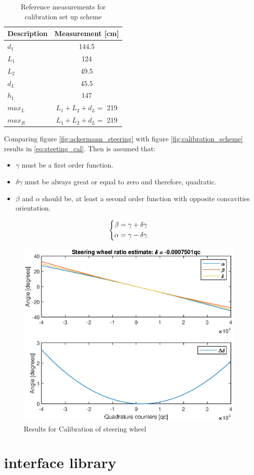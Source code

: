 \begin{table}[!hb]
	\centering
	\begin{tabular}{lc}
		\toprule
		\textbf{Description} & \textbf{Measurement [cm]}\\
		\midrule
		$d_1$ & 144.5\\
		$L_1$ & 124\\
		$L_2$ & 49.5\\
		$d_L$ & 45.5\\
		$h_1$ & 147\\
		$max_L$ & $L_1+L_2+d_L=$ 219\\
		$max_R$ & $L_1+L_2+d_L=$ 219\\
		\bottomrule
	\end{tabular}
	\caption{Reference measurements for calibration set up scheme}
	\label{tab:calibration_scheme}
\end{table}

Comparing figure \ref{fig:ackermann_steering} with figure \ref{fig:calibration_scheme} results in \eqref{eq:steeting_cal}. Then is assumed that:
\begin{itemize}
	\tightlist
	\item $\gamma$ must be a first order function.
	\item $\delta \gamma$ must be always great or equal to zero and therefore, quadratic.
	\item $\beta$ and $\alpha$ should be, at least a second order function with opposite concavities orientation.
\end{itemize}

\begin{equation}
\centering
\left \lbrace \begin{aligned}
\beta &= \gamma + \delta \gamma\\
\alpha&= \gamma - \delta \gamma
\end{aligned}
\right.
\label{eq:steeting_cal}
\end{equation}

\begin{figure}[!hb]
	\centering
	\includegraphics[width=0.7\linewidth]{figures/Steering_calibration_results.eps}
	\caption{Results for Calibration of steering wheel}
	\label{fig:calibration_results}
\end{figure}

\section{interface library}
\blindtext